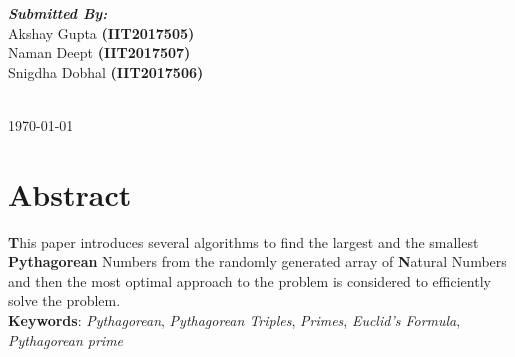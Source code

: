 \documentclass[twocolumn]{article}      %
\begin{document}
\begin{titlepage}
\begin{minipage}{0.4\textwidth}
\begin{flushleft} \large
\textbf{\emph{Submitted By:}}\\
Akshay Gupta \textbf{(IIT2017505)}\\
Naman Deept \textbf{(IIT2017507)}\\
Snigdha Dobhal \textbf{(IIT2017506)}
\end{flushleft}

\end{minipage}\\[2cm]



{\large \today}\\[2cm] %

\vfill %

\end{titlepage}
\maketitle                   %



\section{Abstract} 
\textbf{T}his paper introduces several algorithms to find the largest and the smallest \textbf{Pythagorean} Numbers from the randomly generated array of \textbf{N}atural Numbers and then the most optimal approach to the problem is considered to efficiently solve the problem.\\
\textbf{Keywords}: \textit{Pythagorean}, \textit{Pythagorean Triples}, \textit{Primes}, \textit{Euclid's Formula}, \textit{Pythagorean prime}
\end{document}
